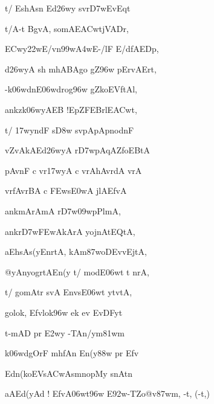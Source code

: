 {\dn t/ Es\2hAsn\? Ed\326wy\? sv\0r\3D7wEvEqt\?{\dandabdn} \dontdisplaylinenum}

{\dn t/A-t\? BgvA\5, somAE\3ACwtjVADr, \vegdn\dontdisplaylinenum}

{\dn \3ECwy\322wE/vn\399w\?\3A4wE-/lF E/dfAEDp,{\dandabdn} \dontdisplaylinenum}

{\dn d\?\326wyA sh mhABAgo gZ\4\396w pErvAErt, \vegdn\dontdisplaylinenum}

{\dn -k\306wdnE\306wdrog\396w gZkoEVftAl,{\dandabdn} \dontdisplaylinenum}

{\dn an\?kzk\306wyAEB !EpZFEBrlE\3ACwt, \vegdn\dontdisplaylinenum}

{\dn t/ \317wyndF s\3D8w sv\0pApApnodnF{\dandabdn} \dontdisplaylinenum}

{\dn {}vZ\0vAkAEd\326wyA r\3D7wpAqAZfoEBtA \vegdn\dontdisplaylinenum}

{\dn pAvnF c vr\?\317wyA c vrAhA\0vrdA vrA{\dandabdn} \dontdisplaylinenum}

{\dn vr\?fAvrBA c \3FEws\3E0wA jlAEfvA \vegdn\dontdisplaylinenum}

{\dn an\?kmArAmA r\3D7w\309wpPlmA,{\dandabdn} \dontdisplaylinenum}

{\dn an\?kr\3D7w\3FEwAkArA yojnAtEQtA, \vegdn\dontdisplaylinenum}

{\dn aEh\2sAs(yEnrtA, kAm\387woDEvvEj\0tA,{\dandabdn} \dontdisplaylinenum}

{\dn @yAnyogrtAEn(y\2 t/ modE\306wt t\? nrA, \vegdn\dontdisplaylinenum }

{\dn t/ gomAtr svA\0 EnvsE\306wt ytv\5tA,{\dandabdn} \dontdisplaylinenum}

{\dn golok, Efvlok\396w ek ev EvDFyt\? \vegdn\dontdisplaylinenum}

{\dn t-mAD{\rdt} pr\2 \3E2w\?y\2 -TAn/ym\381wm \dontdisplaylinenum}

{\dn k\306wdgOrF mh\?fAn\2 En(y\388w\2 pr\2 Efv \vegdn\dontdisplaylinenum}

{\dn Edn(koEVs\3ACwAsmnopMy\2 snAtn \dontdisplaylinenum}

{\dn aAEd(yAd {\rs !\re} EfvA\306wt\396w E\392w-T\?Zo@v\0\387wm\4, -t, {\rs (\re}-t,{\rs )\re} \vegdn\dontdisplaylinenum}



